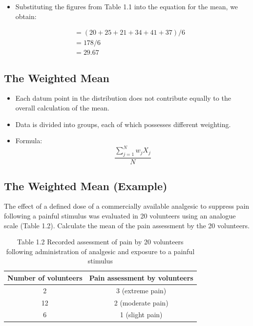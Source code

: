 \documentclass[]{article}
\providecommand{\tightlist}{%
  \setlength{\itemsep}{0pt}\setlength{\parskip}{0pt}}
\begin{document}
\begin{itemize}
\tightlist
\item
  Substituting the figures from Table 1.1 into the equation for the
  mean, we obtain:
\end{itemize}

\[\begin{aligned} &= (20 + 25 + 21 + 34 + 41 + 37)/6 \\ &= 178/6 \\ &= 29.67   \end{aligned}\]

\hypertarget{the-weighted-mean}{%
\subsection{The Weighted Mean}\label{the-weighted-mean}}

\begin{itemize}
\tightlist
\item
  Each datum point in the distribution does not contribute equally to
  the overall calculation of the mean.
\item
  Data is divided into groups, each of which possesses different
  weighting.
\item
  Formula:\\
  \[\frac{\sum_{j=1}^N w_j X_j}{N}\]
\end{itemize}

\hypertarget{the-weighted-mean-example}{%
\subsection{The Weighted Mean
(Example)}\label{the-weighted-mean-example}}

The effect of a defined dose of a commercially available analgesic to
suppress pain following a painful stimulus was evaluated in 20
volunteers using an analogue scale (Table 1.2). Calculate the mean of
the pain assessment by the 20 volunteers.

\begin{table}

\caption{\label{tab:unnamed-chunk-11}Table 1.2 Recorded assessment of pain by 20 volunteers following administration of analgesic and exposure to a painful stimulus
}
\centering
\fontsize{20}{22}\selectfont
\begin{tabular}[t]{c|c}
\hline
Number of volunteers & Pain assessment by volunteers\\
\hline
2 & 3 (extreme pain)\\
\hline
12 & 2 (moderate pain)\\
\hline
6 & 1 (slight pain)\\
\hline
\end{tabular}
\end{table}
\end{document}
